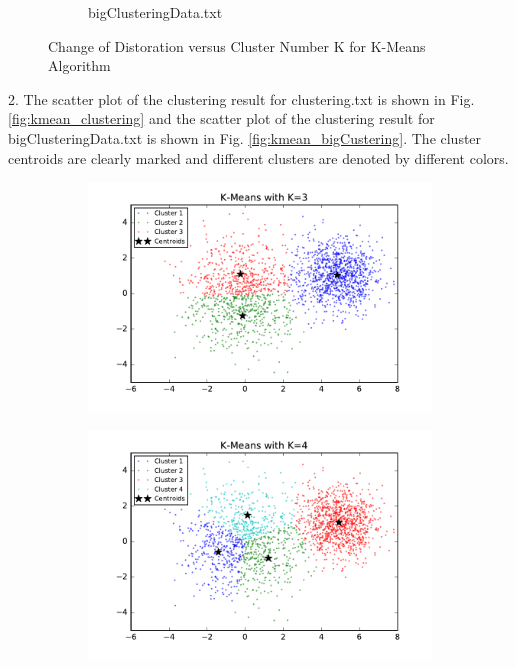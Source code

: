 \begin{description}
\begin{description}
\begin{figure}[H]
\begin{subfigure}[b]{0.49\textwidth}
            \caption{bigClusteringData.txt}\label{fig:1b}
        \end{subfigure}
\caption{Change of Distoration versus Cluster Number K for K-Means Algorithm}
\label{fig:k-means-loss} 
\end{figure}

\item{2.} The scatter plot of the clustering result for clustering.txt is shown in Fig. \ref{fig:kmean_clustering} and the scatter plot of the clustering result for bigClusteringData.txt is shown in Fig. \ref{fig:kmean_bigCustering}. The cluster centroids are clearly marked and different clusters are denoted by different colors. 

\begin{figure}[!h]
        \centering
        \begin{subfigure}[b]{0.475\textwidth}
            \centering
            \includegraphics[width=\textwidth]{./figures/clustering_kMeans_3.pdf}
        \end{subfigure}
        \hfill
        \begin{subfigure}[b]{0.475\textwidth}  
            \centering 
            \includegraphics[width=\textwidth]{./figures/clustering_kMeans_4.pdf}

\end{subfigure}
\end{figure}
\end{description}
\end{description}

